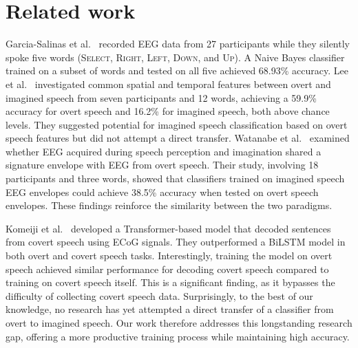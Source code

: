 \section{Related work}
\label{sec:relatedwork}

Garcia-Salinas et al.~\cite{garcia2019transfer} recorded EEG data from 27 participants
while they silently spoke five words (\textsc{Select}, \textsc{Right}, \textsc{Left}, \textsc{Down}, and \textsc{Up}). 
A Naive Bayes classifier trained on a subset of words and tested on all five achieved 68.93\% accuracy.
Lee et al.~\cite{lee2020eeg} investigated common spatial and temporal features 
between overt and imagined speech from seven participants and 12 words, 
achieving a 59.9\% accuracy for overt speech and 16.2\% for imagined speech, both above chance levels. 
They suggested potential for imagined speech classification based on overt speech features 
but did not attempt a direct transfer. 
Watanabe et al.~\cite{watanabe2020synchronization} examined whether 
EEG acquired during speech perception and imagination shared a signature envelope with EEG from overt speech. 
Their study, involving 18 participants and three words, showed that classifiers trained on imagined speech EEG envelopes 
could achieve 38.5\% accuracy when tested on overt speech envelopes. 
These findings reinforce the similarity between the two paradigms.

Komeiji et al.~\cite{komeiji2024feasibility} developed a Transformer-based model 
that decoded sentences from covert speech using ECoG signals. 
They outperformed a BiLSTM model in both overt and covert speech tasks. 
Interestingly, training the model on overt speech achieved similar performance for decoding covert speech 
compared to training on covert speech itself. 
This is a significant finding, as it bypasses the difficulty of collecting covert speech data. 
Surprisingly, to the best of our knowledge, no research has yet attempted 
a direct transfer of a classifier from overt to imagined speech. 
Our work therefore addresses this longstanding research gap, 
offering a more productive training process while maintaining high accuracy.